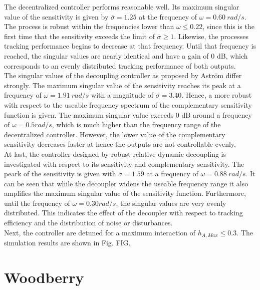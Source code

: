 The decentralized controller performs reasonable well. Its maximum singular value of the sensitivity is given by $\overline{\sigma} = 1.25$ at the frequency of $\omega = 0.60 ~rad/s$. The process is robust within the frequencies lower than $\omega \leq 0.22$, since this is the first time that the sensitivity exceeds the limit of $\overline{\sigma} \geq 1$. Likewise, the processes tracking performance begins to decrease at that frequency. Until that frequency is reached, the singular values are nearly identical and have a gain of 0 dB, which corresponds to an evenly distributed tracking performance of both outputs. \\

The singular values of the decoupling controller as proposed by Astr\"om differ strongly. The maximum singular value of the sensitivity reaches its peak at a frequency of $\omega = 1.91 ~rad/s$ with a magnitude of $\overline{\sigma} = 3.40$. Hence, a more robust with respect to the useable frequency spectrum of the complementary sensitivity function is given. The maximum singular value exceeds 0 dB around a frequency of $\omega = 0.5 rad/s$, which is much higher than the frequency range of the decentralized controller. However, the lower value of the complementary sensitivity decreases faster at hence the outputs are not controllable evenly.\\

At last, the controller designed by robust relative dynamic decoupling is investigated with respect to its sensitivity and complementary sensitivity. The peark of the sensitivity is given with $\overline{\sigma} = 1.59$ at a frequency of $\omega = 0.88 ~rad/s$. It can be seen that while the decoupler widens the useable frequency range it also amplifies the maximum singular value of the sensitivity function. Furthermore, until the frequency of $\omega = 0.30 rad/s$, the singular values are very evenly distributed. This indicates the effect of the decoupler with respect to tracking efficiency and the distribution of noise or disturbances.\\

Next, the controller are detuned for a maximum interaction of $h_{A,Max} \leq 0.3$. The simulation results are shown in Fig. FIG.




\section{Woodberry}%
\label{c:fotd:s:woodberry}

